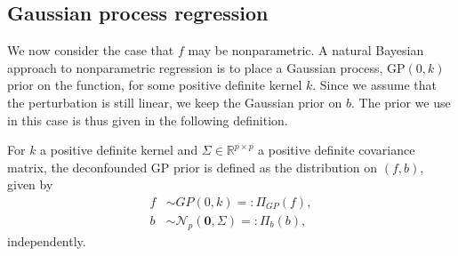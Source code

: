 \documentclass[11pt]{article}
\newcommand{\R}{\mathbb{R}}
\newcommand{\N}{\mathcal{N}}
\begin{document}
\subsection{Gaussian process regression}
We now consider the case that $f$ may be nonparametric. A natural Bayesian approach to nonparametric regression is to place a Gaussian process, $\textrm{GP}(0, k)$ prior on the function, for some positive definite kernel $k$. Since we assume that the perturbation is still linear, we keep the Gaussian prior on $b$. The prior we use in this case is thus given in the following definition.
\begin{definition}\label{def:decon_GP}
For $k$ a positive definite kernel and $\Sigma \in \R^{p \times p}$ a positive definite covariance matrix, the deconfounded GP prior is defined as the distribution on $(f, b)$, given by
	\begin{align*}
		f &\sim GP(0, k) =: \Pi_{GP}(f),\\
		b &\sim \N_p(\mathbf{0}, \Sigma) =: \Pi_b(b),
	\end{align*}
	independently.
\end{definition}
\end{document}
